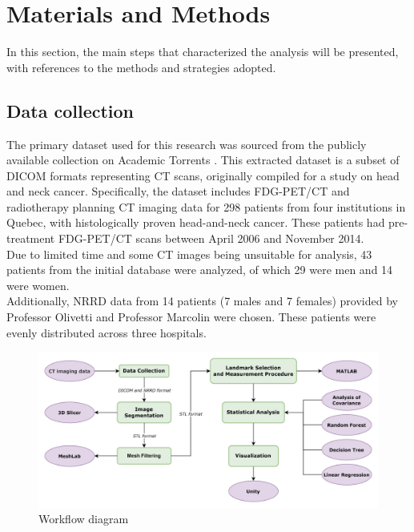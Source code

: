 \documentclass[journal,article,submit,pdftex,moreauthors]{Definitions/mdpi}
\begin{document}
\section{Materials and Methods}
\label{sec:matmet}
In this section, the main steps that characterized the analysis will be presented, with references to the methods and strategies adopted.

\subsection{Data collection}

The primary dataset used for this research was sourced from the publicly available collection on Academic Torrents \cite{ref27}. This extracted dataset is a subset of DICOM formats representing CT scans, originally compiled for a study on head and neck cancer. Specifically, the dataset includes FDG-PET/CT and radiotherapy planning CT imaging data for 298 patients from four institutions in Quebec, with histologically proven head-and-neck cancer. These patients had pre-treatment FDG-PET/CT scans between April 2006 and November 2014.\\
Due to limited time and some CT images being unsuitable for analysis, 43 patients from the initial database were analyzed, of which 29 were men and 14 were women. \\
Additionally, NRRD data from 14 patients (7 males and 7 females) provided by Professor Olivetti and Professor Marcolin were chosen. These patients were evenly distributed across three hospitals.

\begin{figure}[H]
\centering
\begin{minipage}{0.8\textwidth}
\centering
\includegraphics[width=1\linewidth]{Definitions/diagramma.jpg}
\caption{Workflow diagram}
\label{fig1}
\end{minipage}
\end{figure}
\end{document}
